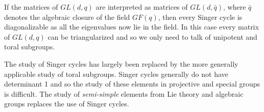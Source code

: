\documentclass[12pt]{article}
\begin{document}
If the matrices of $GL(d,q)$ are interpreted as matrices of $GL(d,\bar{q})$, where $\bar{q}$ denotes the algebraic closure of the field $GF(q)$, then every Singer cycle is diagonalizable as all the eigenvalues now lie in the field.  In this case every matrix of $GL(d,q)$ can be triangularized and so we only need to talk of unipotent and toral subgroups.

The study of Singer cycles has largely been replaced by the more generally applicable study of toral subgroups.  Singer cycles generally do not have determinant 1 and so the study of these elements in projective and special groups is difficult.  The study of \emph{semi-simple} elements from Lie theory and algebraic groups replaces the use of Singer cycles.
\end{document}
